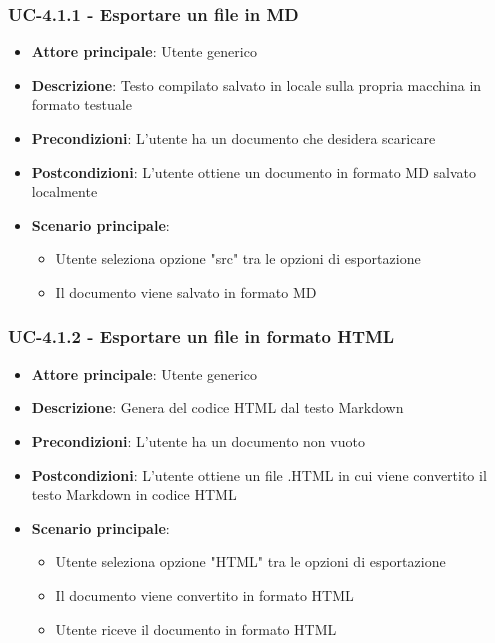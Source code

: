 \documentclass[11pt,a4paper]{article}
\begin{document}
\subsubsection{UC-4.1.1 - Esportare un file in MD}
\begin{itemize}
    \item \textbf{Attore principale}: Utente generico
    \item \textbf{Descrizione}: Testo compilato salvato in locale sulla propria macchina in formato testuale
    \item \textbf{Precondizioni}: L'utente ha un documento che desidera scaricare
    \item \textbf{Postcondizioni}: L'utente ottiene un documento in formato MD salvato localmente
    \item \textbf{Scenario principale}:
        \begin{itemize}
            \item Utente seleziona opzione "src" tra le opzioni di esportazione
            \item Il documento viene salvato in formato MD
        \end{itemize}
\end{itemize}

\subsubsection{UC-4.1.2 - Esportare un file in formato HTML}
\begin{itemize}
    \item \textbf{Attore principale}: Utente generico
    \item \textbf{Descrizione}: Genera del codice HTML dal testo Markdown
    \item \textbf{Precondizioni}: L'utente ha un documento non vuoto
    \item \textbf{Postcondizioni}: L'utente ottiene un file .HTML in cui viene convertito il testo Markdown in codice HTML
    \item \textbf{Scenario principale}:
        \begin{itemize}
            \item Utente seleziona opzione "HTML" tra le opzioni di esportazione
            \item Il documento viene convertito in formato HTML
            \item Utente riceve il documento in formato HTML
        \end{itemize}
\end{itemize}
\end{document}
